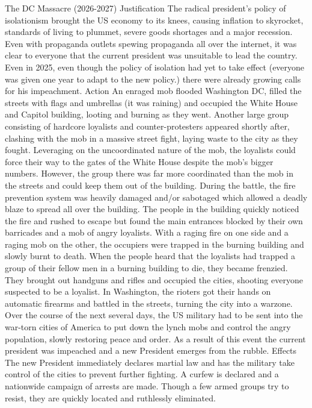    The DC Massacre (2026-2027)
        Justification
            The radical president's policy of isolationism brought the US economy to its knees, causing inflation to skyrocket, standards of living to plummet, severe goods shortages and a major recession.
            Even with propaganda outlets spewing propaganda all over the internet, it was clear to everyone that the current president was unsuitable to lead the country. Even in 2025, even though the policy of isolation had yet to take effect (everyone was given one year to adapt to the new policy.) there were already growing calls for his impeachment.
        Action
            An enraged mob flooded Washington DC, filled the streets with flags and umbrellas (it was raining) and occupied the White House and Capitol building, looting and burning as they went. Another large group consisting of hardcore loyalists and counter-protesters appeared shortly after, clashing with the mob in a massive street fight, laying waste to the city as they fought. Leveraging on the uncoordinated nature of the mob, the loyalists could force their way to the gates of the White House despite the mob's bigger numbers. However, the group there was far more coordinated than the mob in the streets and could keep them out of the building.
            During the battle, the fire prevention system was heavily damaged and/or sabotaged which allowed a deadly blaze to spread all over the building. The people in the building quickly noticed the fire and rushed to escape but found the main entrances blocked by their own barricades and a mob of angry loyalists. With a raging fire on one side and a raging mob on the other, the occupiers were trapped in the burning building and slowly burnt to death.
            When the people heard that the loyalists had trapped a group of their fellow men in a burning building to die, they became frenzied. They brought out handguns and rifles and occupied the cities, shooting everyone suspected to be a loyalist. In Washington, the rioters got their hands on automatic firearms and battled in the streets, turning the city into a warzone.
            Over the course of the next several days, the US military had to be sent into the war-torn cities of America to put down the lynch mobs and control the angry population, slowly restoring peace and order.
            As a result of this event the current president was impeached and a new President emerges from the rubble.
        Effects
            The new President immediately declares martial law and has the military take control of the cities to prevent further fighting. A curfew is declared and a nationwide campaign of arrests are made. Though a few armed groups try to resist, they are quickly located and ruthlessly eliminated.

